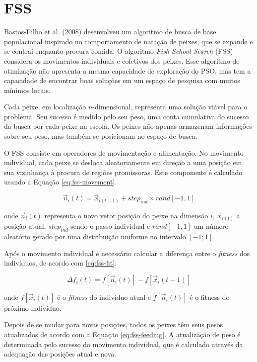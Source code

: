 \section{FSS}
\label{sec-fss}

Bastos-Filho et al. (2008) \cite{bastos2008novel} desenvolveu um algoritmo de busca de base populacional inspirado no comportamento de natação de peixes, que se expande e se contrai enquanto procura comida. O algoritmo \textit{Fish School Search} (FSS) considera os movimentos individuais e coletivos dos peixes. Esse algoritmo de otimização não apresenta a mesma capacidade de exploração do PSO, mas tem a capacidade de encontrar boas soluções em um espaço de pesquisa com muitos mínimos locais.

Cada peixe, em localização $n$-dimensional, representa uma solução viável para o problema. Seu sucesso é medido pelo seu peso, uma conta cumulativa do sucesso da busca por cada peixe na escola. Os peixes não apenas armazenam informações sobre seu peso, mas também se posicionam no espaço de busca.

O FSS consiste em operadores de movimentação e alimentação. No movimento individual, cada peixe se desloca aleatoriamente em direção a uma posição em sua vizinhança à procura de regiões promissoras. Este componente é calculado usando a Equação \ref{eq:fss-movement}.

\begin{equation} \label{eq:fss-movement}
    \vec{n}_{i}(t) = \vec{x}_{i(t-1)} + step_{ind} \times rand[-1,1]
\end{equation}

onde $\vec{n}_{i}(t) $ representa o novo vetor posição do peixe na dimensão $i$, $ \vec{x}_{i(t)} $  a posição atual, $ step_{ind} $ sendo o passo individual e $ rand[-1,1]$ um número aleatório gerado por uma distribuição uniforme no intervalo $[-1; 1]$.

Após o movimento individual é necessário calcular a diferença entre o \textit{fitness} dos indivíduos, de acordo com \ref{eq:fss-fit}:

\begin{equation} \label{eq:fss-fit}
    \Delta f_{i}(t) = f[\vec{n}_{i}(t)] - f[\vec{x}_{i}(t-1)]
\end{equation}

onde $f[\vec{x}_{i}(t)]$ é o \textit{fitness} do indivíduo atual e $f[\vec{n}_{i}(t)]$ é o fitness do próximo indivíduo.

Depois de se mudar para novas posições, todos os peixes têm seus pesos atualizados de acordo com a Equação \ref{eq:fss-feeding}. A atualização de peso é determinada pelo sucesso do movimento individual, que é calculado através da adequação das posições atual e nova.

